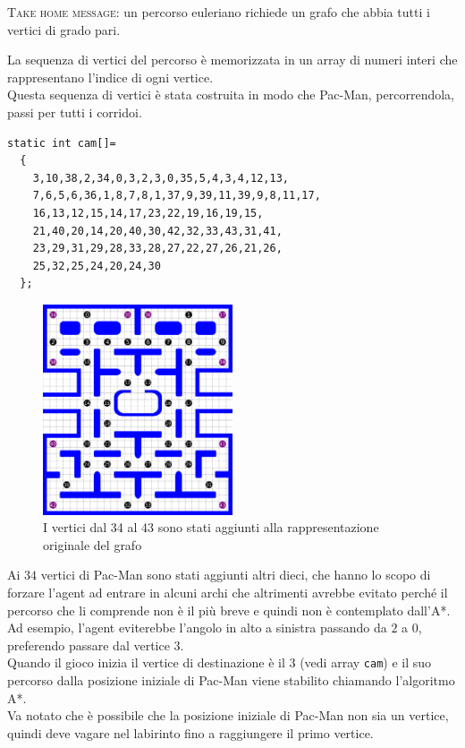 \documentclass[8pt]{book}
\begin{document}
\textsc{Take home message:} un percorso euleriano richiede un grafo che abbia tutti i vertici di grado pari.

La sequenza di vertici del percorso è memorizzata in un array di numeri interi che rappresentano l'indice di ogni vertice.\\
Questa sequenza di vertici è stata costruita in modo che Pac-Man, percorrendola, passi per tutti i corridoi.\\ 

\begin{spacing}{0.9}
  \begin{small}
    \begin{tcolorbox}
\begin{verbatim}
static int cam[]=
  {
    3,10,38,2,34,0,3,2,3,0,35,5,4,3,4,12,13,
    7,6,5,6,36,1,8,7,8,1,37,9,39,11,39,9,8,11,17,
    16,13,12,15,14,17,23,22,19,16,19,15,
    21,40,20,14,20,40,30,42,32,33,43,31,41,
    23,29,31,29,28,33,28,27,22,27,26,21,26,
    25,32,25,24,20,24,30
  };
\end{verbatim}
  \end{tcolorbox}
    \end{small}
      \end{spacing}

\begin{figure}[H]
  \centering
  \includegraphics[width=0.5\textwidth]{img/verticiAggiunti.png}
  \caption{I vertici dal 34 al 43 sono stati aggiunti alla rappresentazione originale del grafo}
  \label{grafoNodiAggiunti}
\end{figure}


Ai $34$ vertici di Pac-Man sono stati aggiunti altri dieci, che hanno lo scopo di forzare l'agent ad entrare in alcuni archi che altrimenti avrebbe evitato perché il percorso che li comprende non è il più breve e quindi non è contemplato dall'A*. Ad esempio, l'agent eviterebbe l'angolo in alto a sinistra passando da $2$ a $0$, preferendo passare dal vertice $3$.\\
Quando il gioco inizia il vertice di destinazione è il $3$ (vedi array \texttt{cam}) e il suo percorso dalla posizione iniziale di Pac-Man viene stabilito chiamando l'algoritmo A*.\\
Va notato che è possibile che la posizione iniziale di Pac-Man non sia un vertice, quindi deve vagare nel labirinto fino a raggiungere il primo vertice.
\end{document}
